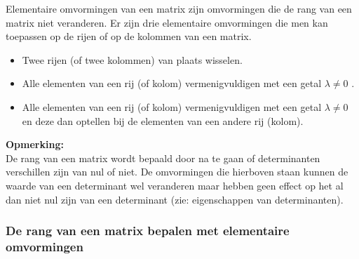 \begin{framed}
	
Elementaire omvormingen van een matrix zijn omvormingen die de rang van een matrix niet veranderen. Er zijn drie elementaire omvormingen die men kan toepassen op de rijen of op de kolommen van een matrix.
\begin{itemize}
	\item Twee rijen (of twee kolommen) van plaats wisselen.
	\item Alle elementen van een rij (of kolom) vermenigvuldigen met een getal $\lambda \neq 0$ .
	\item Alle elementen van een rij (of kolom) vermenigvuldigen met een getal $\lambda \neq 0$ en deze dan optellen bij de elementen van een andere rij (kolom).
\end{itemize}

\end{framed}

{\bf Opmerking:}\\

De rang van een matrix wordt bepaald door na te gaan of  determinanten verschillen zijn van nul of niet. De omvormingen die hierboven staan kunnen de waarde van een determinant wel veranderen maar hebben geen effect op het al dan niet nul zijn van een determinant (zie: eigenschappen van determinanten).\\

\subsubsection{De rang van een matrix bepalen met elementaire omvormingen}

